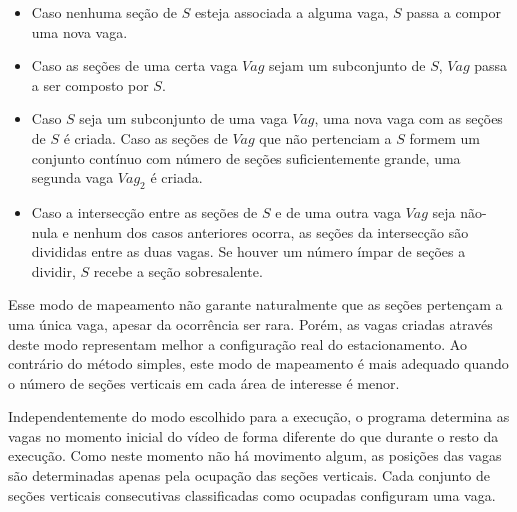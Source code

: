 \begin{itemize}
	\item Caso nenhuma seção de $S$ esteja associada a alguma vaga, $S$ passa a compor uma nova vaga.
	\item Caso as seções de uma certa vaga $Vag$ sejam um subconjunto de $S$, $Vag$ passa a ser composto por $S$.
	\item Caso $S$ seja um subconjunto de uma vaga $Vag$, uma nova vaga com as seções de $S$ é criada. Caso as seções de $Vag$ que não pertenciam a $S$ formem um conjunto contínuo com número de seções suficientemente grande, uma segunda vaga $Vag_2$ é criada.
	\item Caso a intersecção entre as seções de $S$ e de uma outra vaga $Vag$ seja não-nula e nenhum dos casos anteriores ocorra, as seções da intersecção são divididas entre as duas vagas. Se houver um número ímpar de seções a dividir, $S$ recebe a seção sobresalente.
\end{itemize}

Esse modo de mapeamento não garante naturalmente que as seções pertençam a uma única vaga, apesar da ocorrência ser rara. Porém, as vagas criadas através deste modo representam melhor a configuração real do estacionamento. Ao contrário do método simples, este modo de mapeamento é mais adequado quando o número de seções verticais em cada área de interesse é menor.

Independentemente do modo escolhido para a execução, o programa determina as vagas no momento inicial do vídeo de forma diferente do que durante o resto da execução. Como neste momento não há movimento algum, as posições das vagas são determinadas apenas pela ocupação das seções verticais. Cada conjunto de seções verticais consecutivas classificadas como ocupadas configuram uma vaga.







